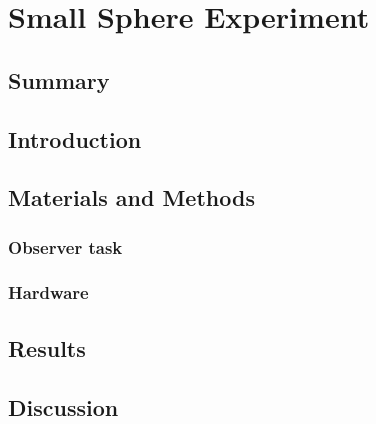 \chapter{Small Sphere Experiment}
\label{chap:SmallSphere}

\section{Summary}
\section{Introduction}


\section{Materials and Methods}
\subsection{Observer task}
\subsection{Hardware}

\section{Results}


\section{Discussion}

